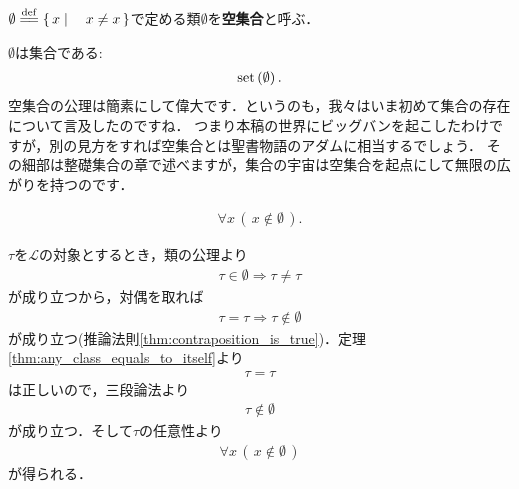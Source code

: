 	\begin{screen}
		\begin{dfn}[空集合]
			$\emptyset \defeq \Set{x}{x \neq x}$で定める類$\emptyset$を{\bf 空集合}と呼ぶ．
		\end{dfn}
	\end{screen}
	
	\begin{screen}
		\begin{axm}[空集合の公理]
			$\emptyset$は集合である:
			\begin{align}
				\operatorname*{set} \left(\emptyset\right).
			\end{align}		
			空集合の公理は簡素にして偉大です．というのも，我々はいま初めて集合の存在について言及したのですね．
			つまり本稿の世界にビッグバンを起こしたわけですが，別の見方をすれば空集合とは聖書物語のアダムに相当するでしょう．
			その細部は整礎集合の章で述べますが，集合の宇宙は空集合を起点にして無限の広がりを持つのです．
		\end{axm}
	\end{screen}
	
	\begin{screen}
		\begin{thm}\label{thm:emptyset_has_nothing}
			\begin{align}
				\forall x\, (\, x \notin \emptyset\, ).
			\end{align}
		\end{thm}
	\end{screen}
	
	\begin{sketch}
		$\tau$を$\mathscr{L}$の対象とするとき，類の公理より
		\begin{align}
			\tau \in \emptyset \Longrightarrow \tau \neq \tau
		\end{align}
		が成り立つから，対偶を取れば
		\begin{align}
			\tau = \tau \Longrightarrow \tau \notin \emptyset
		\end{align}
		が成り立つ(推論法則\ref{thm:contraposition_is_true})．定理\ref{thm:any_class_equals_to_itself}より
		\begin{align}
			\tau = \tau
		\end{align}
		は正しいので，三段論法より
		\begin{align}
			\tau \notin \emptyset
		\end{align}
		が成り立つ．そして$\tau$の任意性より
		\begin{align}
			\forall x\, (\, x \notin \emptyset\, )
		\end{align}
		が得られる．
		\QED
	\end{sketch}
	
